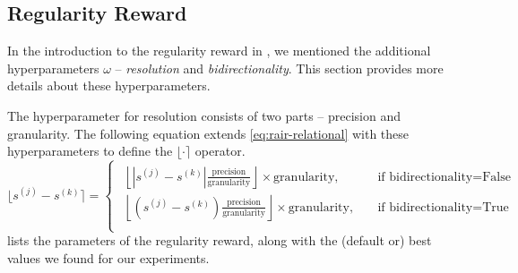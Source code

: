 
\newpage
\subsection{Regularity Reward}
\label{sec:regularity-reward-details}

In the introduction to the regularity reward in , we mentioned the additional hyperparameters \(\omega\) -- \emph{resolution} and \emph{bidirectionality}.
This section provides more details about these hyperparameters.

The hyperparameter for resolution consists of two parts -- precision and granularity.
The following equation extends \eqref{eq:rair-relational} with these hyperparameters to define the \(\lfloor \cdot \rceil\) operator.
\begin{equation}
    \lfloor s^{(j)} - s^{(k)} \rceil = \begin{cases}\begin{aligned}
        \left\lfloor \left| s^{(j)} - s^{(k)} \right| \frac{\text{precision}}{\text{granularity}} \right\rfloor \times \text{granularity},\quad&\text{if bidirectionality} = \text{False}\\
        \left\lfloor \left( s^{(j)} - s^{(k)} \right) \frac{\text{precision}}{\text{granularity}} \right\rfloor \times \text{granularity},\quad&\text{if bidirectionality} = \text{True}\\
    \end{aligned}\end{cases}
    \label{eq:rair-relational-extended}
\end{equation}
 lists the parameters of the regularity reward, along with the (default or) best values we found for our experiments.
